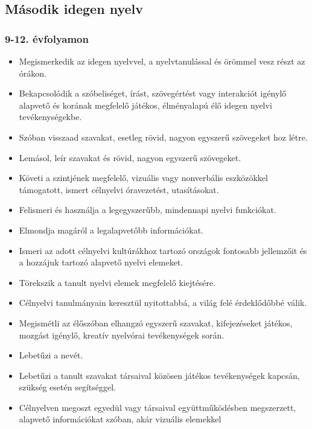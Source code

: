 \hypertarget{masodik-idegen-nyelv}{%
\subsection{Második idegen nyelv}\label{masodik-idegen-nyelv}}

\hypertarget{evfolyamon-6}{%
\subsubsection{9-12. évfolyamon}\label{evfolyamon-6}}

\begin{itemize}
\item
  Megismerkedik az idegen nyelvvel, a nyelvtanulással és örömmel vesz
  részt az órákon.
\item
  Bekapcsolódik a szóbeliséget, írást, szövegértést vagy interakciót
  igénylő alapvető és korának megfelelő játékos, élményalapú élő idegen
  nyelvi tevékenységekbe.
\item
  Szóban visszaad szavakat, esetleg rövid, nagyon egyszerű szövegeket
  hoz létre.
\item
  Lemásol, leír szavakat és rövid, nagyon egyszerű szövegeket.
\item
  Követi a szintjének megfelelő, vizuális vagy nonverbális eszközökkel
  támogatott, ismert célnyelvi óravezetést, utasításokat.
\item
  Felismeri és használja a legegyszerűbb, mindennapi nyelvi funkciókat.
\item
  Elmondja magáról a legalapvetőbb információkat.
\item
  Ismeri az adott célnyelvi kultúrákhoz tartozó országok fontosabb
  jellemzőit és a hozzájuk tartozó alapvető nyelvi elemeket.
\item
  Törekszik a tanult nyelvi elemek megfelelő kiejtésére.
\item
  Célnyelvi tanulmányain keresztül nyitottabbá, a világ felé
  érdeklődőbbé válik.
\item
  Megismétli az élőszóban elhangzó egyszerű szavakat, kifejezéseket
  játékos, mozgást igénylő, kreatív nyelvórai tevékenységek során.
\item
  Lebetűzi a nevét.
\item
  Lebetűzi a tanult szavakat társaival közösen játékos tevékenységek
  kapcsán, szükség esetén segítséggel.
\item
  Célnyelven megoszt egyedül vagy társaival együttműködésben
  megszerzett, alapvető információkat szóban, akár vizuális elemekkel

\end{itemize}
